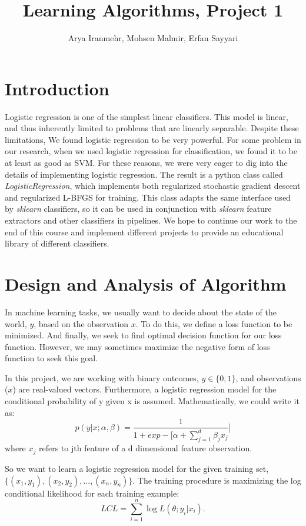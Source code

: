 \documentclass[twoside,12pt]{article}
\begin{document}
\title{Learning Algorithms, Project 1}
\author{Arya Iranmehr, Mohsen Malmir, Erfan Sayyari}
\maketitle

\section{Introduction}
Logistic regression is one of the simplest linear classifiers. This model is linear, and thus inherently limited to problems that are linearly separable. Despite these limitations, We found logistic regression to be very powerful. For some problem in our research, when we used logistic regression for classification, we found it to be at least as good as SVM. For these reasons, we were very eager to dig into the details of implementing logistic regression. The result is a python class called {\it LogisticRegression}, which implements both regularized stochastic gradient descent and regularized L-BFGS for training. This class adapts the same interface used by {\it sklearn} classifiers, so it can be used in conjunction with {\it sklearn} feature extractors and other classifiers  in  pipelines. We hope to continue our work to the end of this course and implement different projects to provide an educational library of different classifiers.
\section{Design and Analysis of Algorithm}
In machine learning tasks, we usually want to decide about the state of the world, $y$, based on the observation $x$. To do this, we define a loss function to be minimized. And finally, we seek to find optimal decision function for our loss function. However, we may sometimes maximize the negative form of loss function to seek this goal. 

In this project, we are working with binary outcomes, $y\in\{{0,1}\}$, and observations ($x$) are real-valued vectors.  Furthermore, a logistic regression model for the conditional probability of y given x is assumed. Mathematically, we could write it as:
\begin{equation}
p(y|x;\alpha,\beta)=\frac{1}{1+exp-[\alpha+\sum_{j=1}^d\beta_jx_j}]
\end{equation}
where $x_j$ refers to jth feature of a d dimensional feature observation. 

So we want to learn a logistic regression model for the given training set, $\{(x_1,y_1),(x_2,y_2),...,(x_n,y_n)\}$. The training procedure is maximizing the log conditional likelihood for each training example:
\begin{equation}
LCL = \sum_{i=1}^n \log L(\theta;y_i | x_i).
\end{equation}
\end{document}

